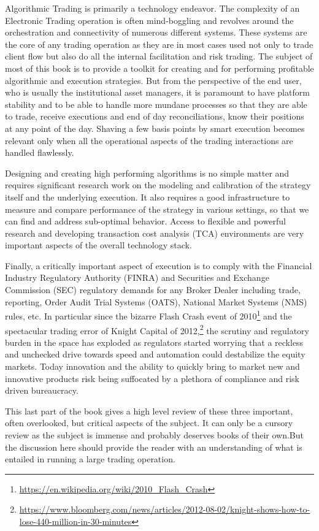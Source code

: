 
Algorithmic Trading is primarily a technology endeavor. The complexity of an Electronic Trading operation is often mind-boggling and revolves around the orchestration and connectivity of numerous different systems. These systems are the core of any trading operation as they are in most cases used not only to trade client flow but also do all the internal facilitation and risk trading. The subject of most of this book is to provide a toolkit for creating and for performing profitable algorithmic and execution strategies. But from the perspective of the end user, who is usually the institutional asset managers, it is paramount to have platform stability and to be able to handle more mundane processes so that they are able to trade, receive executions and end of day reconciliations, know their positions at any point of the day. Shaving a few basis points by smart execution becomes relevant only when all the operational aspects of the trading interactions are handled flawlessly.


Designing and creating high performing algorithms is no simple matter and requires significant research work on the modeling and calibration of the strategy itself and the underlying execution. It also requires a good infrastructure to measure and compare  performance of the strategy in various settings, so that we can find and address sub-optimal behavior. Access to flexible and powerful research and developing transaction cost analysis (TCA) environments are very important aspects of the overall technology stack.


Finally, a critically important aspect of execution is to comply with the Financial Industry Regulatory Authority (FINRA) and Securities and Exchange Commission (SEC) regulatory demands for any Broker Dealer including trade, reporting, Order Audit Trial Systems (OATS), National Market Systems (NMS) rules, etc. In particular since the bizarre Flash Crash event of 2010\footnote{\url{https://en.wikipedia.org/wiki/2010_Flash_Crash}} and the spectacular trading error of Knight Capital of 2012,\footnote{\url{https://www.bloomberg.com/news/articles/2012-08-02/knight-shows-how-to-lose-440-million-in-30-minutes}} the scrutiny and regulatory burden in the space has exploded as regulators started worrying that a reckless and unchecked drive towards speed and automation could destabilize the equity markets. Today innovation and the ability to quickly bring to market new and innovative products risk being suffocated by a plethora of compliance and risk driven bureaucracy. 


This last part of the book gives a high level review of these three important, often overlooked, but critical aspects of the subject. It can only be a cursory review as the subject is immense and probably deserves books of their own.But the discussion here should provide the reader with an understanding of what is entailed in running a large trading operation.